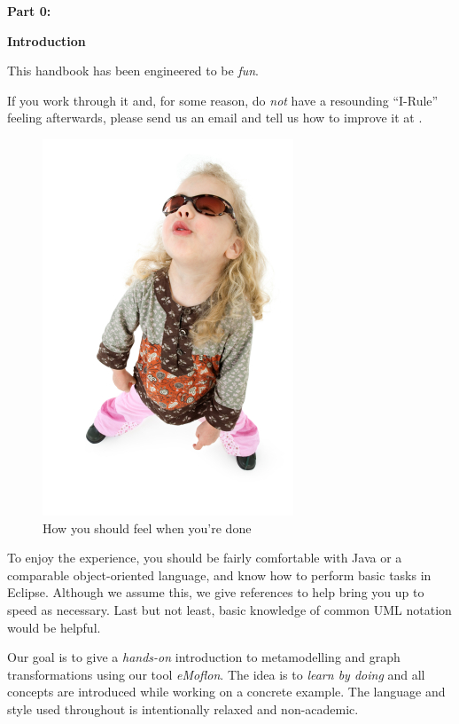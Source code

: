 \genHeader

{\bf \huge Part 0:}

\vspace{0.8cm}

{\bf \Huge Introduction }

\vspace{2cm}


This handbook has been engineered to be \emph{fun}.

If you work through it and, for some reason, do \emph{not} have a resounding \mbox{\enquote{I-Rule}} feeling afterwards, please send us an email and tell us how to improve it at \eMoflonContact.

\downloadLocation{\dlPartZero}

\begin{figure}[htp]
\begin{center}
	\includegraphics[height=0.45\textheight]{../introduction_images/i-rule}
	\caption{How you should feel when you're done}
	\label{i-rule}
\end{center}
\end{figure}
\break
 

To enjoy the experience, you should be fairly comfortable with Java or a comparable object-oriented language, and know how to perform basic tasks in Eclipse. 
Although we assume this, we give references to help bring you up to speed as necessary.
Last but not least, basic knowledge of common UML notation would be helpful.

Our goal is to give a \emph{hands-on} introduction to metamodelling and graph transformations using our tool \emph{eMoflon}.
The idea is to \emph{learn by doing} and all concepts are introduced while working on a concrete example.
The language and style used throughout is intentionally relaxed and non-academic.


